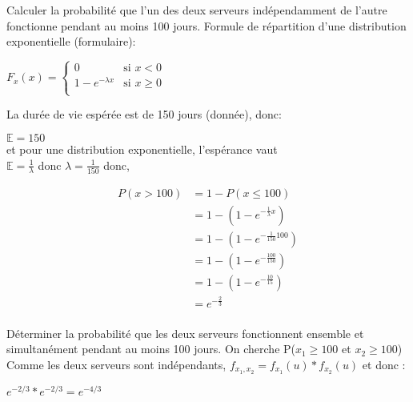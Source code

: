 
\begin{exo}
 
 \begin{subexo}{Calculer la probabilité que l’un des deux serveurs indépendamment de l’autre fonctionne pendant au moins 100 jours.}
 	Formule de répartition d'une distribution exponentielle (formulaire):
 		\begin{center}
 		$ F_x(x) =\begin{cases}
 		0 & \text{si $x < 0$} \\
 		1 - e^{-\lambda x} & \text{si $x \geq 0$} \\
 		\end{cases}$
 		\end{center}
 	La durée de vie espérée est de 150 jours (donnée), donc: 
 		\begin{center}
 			$\mathbb{E} = 150$ \\ 
 			et 	pour une distribution exponentielle, l'espérance vaut \\ 
 			$\mathbb{E} = \frac{1}{\lambda}$ donc $\lambda = \frac{1}{150}$ donc, 
 			
 			\begin{align*}
 			P(x > 100) &= 1 - P(x \le 100) \\
 			&= 1 - (1 - e^{-\frac{1}{\lambda}x})  \\
 			&= 1 - (1 - e^{-\frac{1}{150}100})  \\
 			&= 1 - (1 - e^{-\frac{100}{150}})  \\
 			&= 1 - (1 - e^{-\frac{10}{15}})  \\
 			&= e^{-\frac{2}{3}}  \\
 			\end{align*}
 		\end{center}
 \end{subexo}
  \begin{subexo}{Déterminer la probabilité que les deux serveurs fonctionnent ensemble et simultanément pendant au moins 100 jours.}
  	On cherche P($x_1 \geq 100$ et $x_2  \geq 100$) \\
  	Comme les deux serveurs sont indépendants, $f_{x_1,x_2} = f_{x_1}(u)*f_{x_2}(u)$ et donc :\\
		\begin{center}
			$e^{-2/3} * e^{-2/3} = e^{-4/3}$
		\end{center}
  \end{subexo}
\end{exo}
